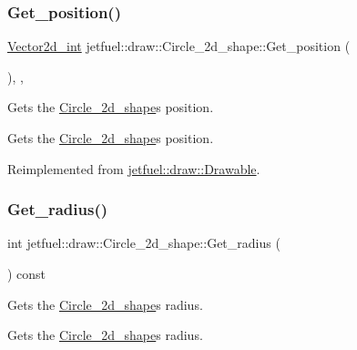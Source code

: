 \subsubsection{\texorpdfstring{Get\+\_\+position()}{Get\_position()}}
{\footnotesize\ttfamily \hyperlink{classjetfuel_1_1draw_1_1Vector2d}{Vector2d\+\_\+int} jetfuel\+::draw\+::\+Circle\+\_\+2d\+\_\+shape\+::\+Get\+\_\+position (\begin{DoxyParamCaption}{ }\end{DoxyParamCaption})\hspace{0.3cm}{\ttfamily [inline]}, {\ttfamily [override]}, {\ttfamily [virtual]}}



Gets the \hyperlink{classjetfuel_1_1draw_1_1Circle__2d__shape}{Circle\+\_\+2d\+\_\+shape}\textquotesingle{}s position. 

Gets the \hyperlink{classjetfuel_1_1draw_1_1Circle__2d__shape}{Circle\+\_\+2d\+\_\+shape}\textquotesingle{}s position. 

Reimplemented from \hyperlink{classjetfuel_1_1draw_1_1Drawable_ae7ebd30d66db2c8a5d5371cbcf0023fc}{jetfuel\+::draw\+::\+Drawable}.

\mbox{\label{classjetfuel_1_1draw_1_1Circle__2d__shape_ae3686026f21348b28769d7a89f59c071}} 
\subsubsection{\texorpdfstring{Get\+\_\+radius()}{Get\_radius()}}
{\footnotesize\ttfamily int jetfuel\+::draw\+::\+Circle\+\_\+2d\+\_\+shape\+::\+Get\+\_\+radius (\begin{DoxyParamCaption}{ }\end{DoxyParamCaption}) const\hspace{0.3cm}{\ttfamily [inline]}}



Gets the \hyperlink{classjetfuel_1_1draw_1_1Circle__2d__shape}{Circle\+\_\+2d\+\_\+shape}\textquotesingle{}s radius. 

Gets the \hyperlink{classjetfuel_1_1draw_1_1Circle__2d__shape}{Circle\+\_\+2d\+\_\+shape}\textquotesingle{}s radius. \mbox{\label{classjetfuel_1_1draw_1_1Circle__2d__shape_a2af81e6479bc9d55b7df7e3c0a392630}} 
